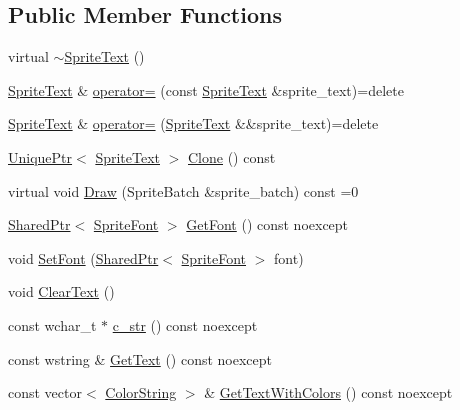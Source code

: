 \subsection*{Public Member Functions}
\begin{DoxyCompactItemize}
\item 
virtual \hyperlink{classmage_1_1_sprite_text_aa30d68a79775dce902c190f2cd298bb4}{$\sim$\+Sprite\+Text} ()
\item 
\hyperlink{classmage_1_1_sprite_text}{Sprite\+Text} \& \hyperlink{classmage_1_1_sprite_text_af027a281c1fa600dd870ca04d91fcae8}{operator=} (const \hyperlink{classmage_1_1_sprite_text}{Sprite\+Text} \&sprite\+\_\+text)=delete
\item 
\hyperlink{classmage_1_1_sprite_text}{Sprite\+Text} \& \hyperlink{classmage_1_1_sprite_text_a7e2e165d7682d9cc623b7c9725f76920}{operator=} (\hyperlink{classmage_1_1_sprite_text}{Sprite\+Text} \&\&sprite\+\_\+text)=delete
\item 
\hyperlink{namespacemage_a3316d7143a973e37adf1110f2e80ca31}{Unique\+Ptr}$<$ \hyperlink{classmage_1_1_sprite_text}{Sprite\+Text} $>$ \hyperlink{classmage_1_1_sprite_text_ad76e6d91e59f5070152104da8af1aa4e}{Clone} () const
\item 
virtual void \hyperlink{classmage_1_1_sprite_text_a45d5ac8410d5a46b26e8491946a2ad9e}{Draw} (Sprite\+Batch \&sprite\+\_\+batch) const =0
\item 
\hyperlink{namespacemage_a1e01ae66713838a7a67d30e44c67703e}{Shared\+Ptr}$<$ \hyperlink{classmage_1_1_sprite_font}{Sprite\+Font} $>$ \hyperlink{classmage_1_1_sprite_text_a64d0e77bafcbdf26b6c39423540e4f20}{Get\+Font} () const noexcept
\item 
void \hyperlink{classmage_1_1_sprite_text_a8e753dcd210b1fdf9c5399a9f0f3415d}{Set\+Font} (\hyperlink{namespacemage_a1e01ae66713838a7a67d30e44c67703e}{Shared\+Ptr}$<$ \hyperlink{classmage_1_1_sprite_font}{Sprite\+Font} $>$ font)
\item 
void \hyperlink{classmage_1_1_sprite_text_a73c5a10e846e94f2f79a25a78bf2e6d0}{Clear\+Text} ()
\item 
const wchar\+\_\+t $\ast$ \hyperlink{classmage_1_1_sprite_text_a236e243b8832cb6e32b1341e798d25bb}{c\+\_\+str} () const noexcept
\item 
const wstring \& \hyperlink{classmage_1_1_sprite_text_adf93f6290fb55685aee478255e88792e}{Get\+Text} () const noexcept
\item 
const vector$<$ \hyperlink{structmage_1_1_color_string}{Color\+String} $>$ \& \hyperlink{classmage_1_1_sprite_text_a2493ad5e9a8c472dae8beb92f51dc882}{Get\+Text\+With\+Colors} () const noexcept

\end{DoxyCompactItemize}
